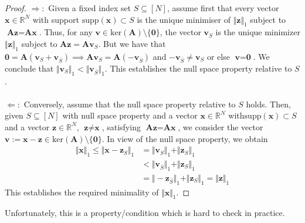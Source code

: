 \begin{proof}
$\Rightarrow:$ Given a fixed index set $S \subseteq [N]$, assume first that every vector $\textbf{x} \in \mathbb{R}^N$ with support $\text{supp}(\textbf{x})\subset S$ is the unique minimiser of $\Vert \textbf{z} \Vert_1$ subject to $\textbf{Az} = \textbf{Ax}$. Thus, for any $\textbf{v} \in \text{ker}(\mathbf{A}) \setminus \{\textbf{0} \}$, the vector $\textbf{v}_S$ is the unique minimizer $\Vert \textbf{z} \Vert_1$ subject to $\textbf{Az} = \textbf{Av}_S$. But we have that $\textbf{0} = \textbf{A}(\textbf{v}_S + \textbf{v}_{\overline{S}}) \implies \textbf{Av}_S = \textbf{A}(-\textbf{v}_{\overline{S}})$ and $-\textbf{v}_{\overline{S}} \neq \textbf{v}_S$ or else $\textbf{v} = \textbf{0}$. We conclude that $\Vert \textbf{v}_S \Vert_1 < \Vert \textbf{v}_{\overline{S}} \Vert_1$. This establishes the null space property relative to $S$.
\\ \\
$\Leftarrow:$ Conversely, assume that the null space property relative to $S$ holds. Then, given $S \subseteq [N]$ with null space property and a vector $\textbf{x} \in \mathbb{R}^N$ with$\text{supp}(\textbf{x})\subset S$ and a vector $\textbf{z} \in \mathbb{R}^N$, $\textbf{z} \neq \textbf{x}$, satisfying $\textbf{Az} = \textbf{Ax}$, we consider the vector $\textbf{v} := \textbf{x} - \textbf{z} \in \text{ker}(\textbf{A}) \setminus \{ \textbf{0} \}$. In view of the null space property, we obtain
\begin{align*}
\Vert \textbf{x} \Vert_1 \leq \Vert \textbf{x} - \textbf{z}_S \Vert_1 &= \Vert \textbf{v}_S \Vert_1 + \Vert \textbf{z}_S \Vert_1 \\
&< \Vert \textbf{v}_{\overline{S}} \Vert_1 + \Vert \textbf{z}_S \Vert_1 \\
&= \Vert -\textbf{z}_{\overline{S}} \Vert_1 + \Vert \textbf{z}_S \Vert_1 = \Vert \textbf{z} \Vert_1
\end{align*}
This establishes the required minimality of $\Vert \textbf{x} \Vert_1$.
\end{proof}
Unfortunately, this is a property/condition which is hard to check in practice.

